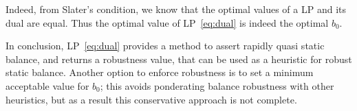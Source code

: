 Indeed, from Slater's condition, we know that the optimal values of a LP and its dual are equal. Thus the optimal value of LP~\ref{eq:dual} is indeed the optimal $b_0$.

In conclusion, LP~\ref{eq:dual} provides a method to assert rapidly quasi static balance, and returns a robustness value, that can be used as a heuristic for robust static balance.
Another option to enforce robustness is to set a minimum acceptable value for $b_0$; this avoids ponderating balance robustness with other heuristics,
but as a result this conservative approach is not complete.
